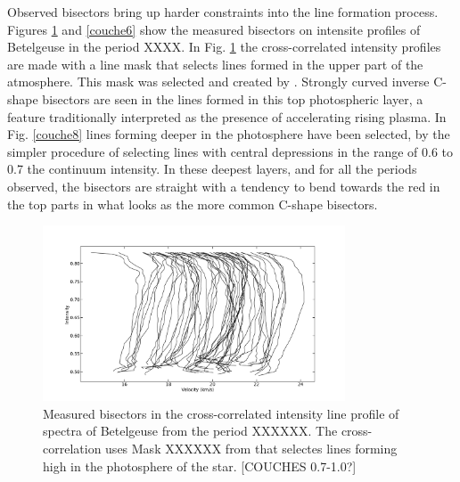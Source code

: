 \documentclass{/Users/art2/TeX/aanda/aa}
\def\kms {km\,s$^{-1}$}
\begin{document}
Observed bisectors bring up harder constraints into the line formation process. Figures \ref{couche0} and \ref{couche6} show the measured 
bisectors on intensite profiles of Betelgeuse in the period XXXX. In Fig. \ref{couche0} the cross-correlated intensity profiles are made with a
 line mask  that selects lines formed in the upper part of the atmosphere. This mask was selected and created by 
 \cite{kravchenko_tomography_2018}. Strongly curved 
inverse C-shape bisectors are seen in the lines formed in this top photospheric layer, a feature traditionally interpreted as the 
presence of accelerating rising plasma.   In Fig. \ref{couche8} lines forming deeper in the photosphere have been selected, by the simpler 
procedure of selecting lines with central depressions in the range of 0.6 to 0.7 the continuum intensity. In these deepest layers, and 
for all the periods observed, the bisectors are straight with a tendency to bend towards the red in the top parts in what looks as 
the more common C-shape bisectors.
\begin{figure}
   \includegraphics[width=0.8\textwidth]{bissecteurmaskKateryna.png}
   \caption{Measured bisectors in the cross-correlated intensity line profile of spectra of Betelgeuse from the period XXXXXX. The cross-correlation
   uses Mask XXXXXX from \cite{kravchenko_tomography_2018} that selectes lines forming high in the photosphere of the star. [COUCHES 0.7-1.0?]}
   \label{couche0}
   \end{figure}
\end{document}
